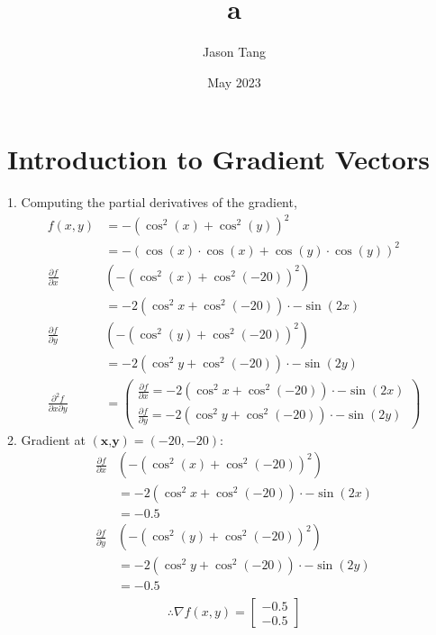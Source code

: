 \documentclass{article}
\title{a}
\author{Jason Tang}
\date{May 2023}
\begin{document}
\maketitle

\section{Introduction to Gradient Vectors}
1. Computing the partial derivatives of the gradient,
\begin{align*}
f(x,y)
&= -(\cos^2(x)+\cos^2(y))^2 \\
&= -(\cos(x)\cdot \cos(x) + \cos(y)\cdot \cos(y))^2 \\
\frac{\partial f}{\partial x}
&(-(\cos^2(x)+\cos^2(-20))^2) \\
&= -2(\cos^2x+\cos^2(-20))\cdot -\sin(2x)\\
\frac{\partial f}{\partial y}
&(-(\cos^2(y)+\cos^2(-20))^2) \\
&= -2(\cos^2y+\cos^2(-20))\cdot -\sin(2y)\\
\frac{\partial^2f}{\partial x\partial y}
&= \begin{pmatrix}
    \frac{\partial f}{\partial x}=-2(\cos^2x+\cos^2(-20))\cdot -\sin(2x) \\
    \frac{\partial f}{\partial y}= -2(\cos^2y+\cos^2(-20))\cdot -\sin(2y)
\end{pmatrix}
\end{align*}
2. Gradient at $(\textbf{x,y}) = (-20, -20)$:
\begin{align*}
\frac{\partial f}{\partial x}
&(-(\cos^2(x)+\cos^2(-20))^2) \\
&= -2(\cos^2x+\cos^2(-20))\cdot -\sin(2x)\\
&= -0.5 \\
\frac{\partial f}{\partial y}
&(-(\cos^2(y)+\cos^2(-20))^2) \\
&= -2(\cos^2y+\cos^2(-20))\cdot -\sin(2y)\\
&= -0.5 \\
\end{align*}
$$\therefore \nabla f(x,y) = \begin{bmatrix}-0.5 \\ -0.5 \end{bmatrix}$$
\end{document}
